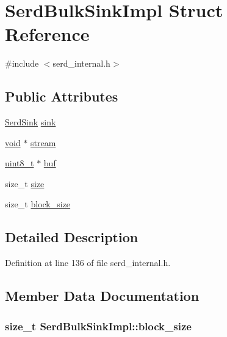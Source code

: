 \hypertarget{struct_serd_bulk_sink_impl}{}\section{Serd\+Bulk\+Sink\+Impl Struct Reference}
\label{struct_serd_bulk_sink_impl}


{\ttfamily \#include $<$serd\+\_\+internal.\+h$>$}

\subsection*{Public Attributes}
\begin{DoxyCompactItemize}
\item 
\hyperlink{group__serd_ga84861f1df2f4d3323cb0113dae4ced12}{Serd\+Sink} \hyperlink{struct_serd_bulk_sink_impl_a264743ac6266d7217d6a23c7452ea035}{sink}
\item 
\hyperlink{sound_8c_ae35f5844602719cf66324f4de2a658b3}{void} $\ast$ \hyperlink{struct_serd_bulk_sink_impl_abeac79c8db3faeb5bf9cc8f2fd0dfad7}{stream}
\item 
\hyperlink{lib-src_2ffmpeg_2win32_2stdint_8h_a9a941819355e6f658991890ff66b4b0e}{uint8\+\_\+t} $\ast$ \hyperlink{struct_serd_bulk_sink_impl_a9d8d208c8cd0bb28a0f58854a4d7e859}{buf}
\item 
size\+\_\+t \hyperlink{struct_serd_bulk_sink_impl_acc59a940f7c2243de2c951d63d19bfc5}{size}
\item 
size\+\_\+t \hyperlink{struct_serd_bulk_sink_impl_ae85e0a6382790fe01314a99426accac8}{block\+\_\+size}
\end{DoxyCompactItemize}


\subsection{Detailed Description}


Definition at line 136 of file serd\+\_\+internal.\+h.



\subsection{Member Data Documentation}
\subsubsection[{\texorpdfstring{block\+\_\+size}{block_size}}]{\setlength{\rightskip}{0pt plus 5cm}size\+\_\+t Serd\+Bulk\+Sink\+Impl\+::block\+\_\+size}\hypertarget{struct_serd_bulk_sink_impl_ae85e0a6382790fe01314a99426accac8}{}\label{struct_serd_bulk_sink_impl_ae85e0a6382790fe01314a99426accac8}


